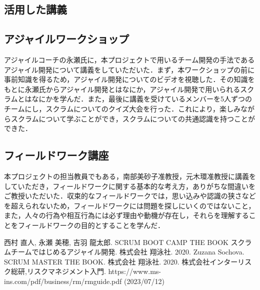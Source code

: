 \documentclass[openany,11pt,papersize,dvipdfm]{jsbook}
\begin{document}
\begin{appendix}
\chapter{活用した講義}
\section{アジャイルワークショップ}
アジャイルコーチの永瀬氏に，本プロジェクトで用いるチーム開発の手法であるアジャイル開発について講義をしていただいた．まず，本ワークショップの前に事前知識を得るため，アジャイル開発についてのビデオを視聴した．その知識をもとに永瀬氏からアジャイル開発とはなにか，アジャイル開発で用いられるスクラムとはなにかを学んだ．また，最後に講義を受けているメンバーを5人ずつのチームにし，スクラムについてのクイズ大会を行った．これにより，楽しみながらスクラムについて学ぶことができ，スクラムについての共通認識を持つことができた．

\section{フィールドワーク講座}
本プロジェクトの担当教員でもある，南部美砂子准教授，元木環准教授に講義をしていただき，フィールドワークに関する基本的な考え方，ありがちな間違いをご教授いただいた．収束的なフィールドワークでは，思い込みや認識の狭さなどを超えられないため，フィールドワークには問題を探しにいくのではないこと，また，人々の行為や相互行為には必ず理由や動機が存在し，それらを理解することをフィールドワークの目的とすることを学んだ．

\end{appendix}

\begin{thebibliography}{3}
     西村 直人, 永瀬 美穂, 吉羽 龍太郎. SCRUM BOOT CAMP THE BOOK スクラムチームではじめるアジャイル開発. 株式会社 翔泳社. 2020.
     Zuzana Sochova. SCRUM MASTER THE BOOK. 株式会社 翔泳社. 2020.
     株式会社インターリスク総研,リスクマネジメント入門. https://www.ms-ins.com/pdf/business/rm/rmguide.pdf (2023/07/12)
\end{thebibliography}
\end{document}
